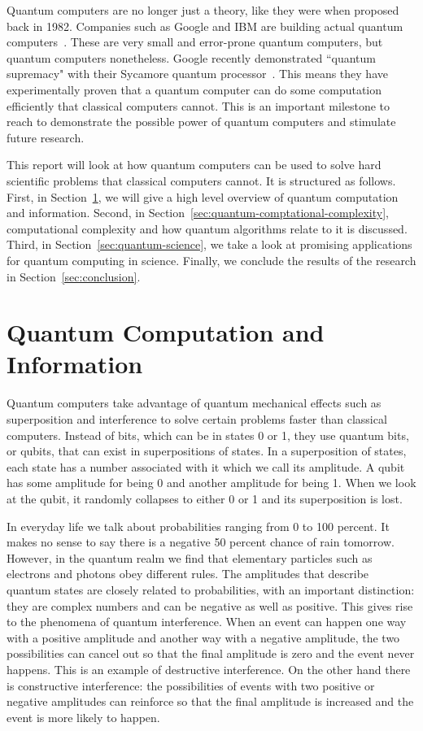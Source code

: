 \documentclass[twocolumn, switch]{article}
\begin{document}
    Quantum computers are no longer just a theory, like they were when proposed back in 1982.
    Companies such as Google and IBM are building actual quantum computers~\cite{google-quantum, ibm-quantum}.
    These are very small and error-prone quantum computers, but quantum computers nonetheless.
    Google recently demonstrated ``quantum supremacy" with their Sycamore quantum processor~\cite{arute2019quantum}.
    This means they have experimentally proven that a quantum computer can do some computation efficiently that classical computers cannot.
    This is an important milestone to reach to demonstrate the possible power of quantum computers and stimulate future research.
    
    This report will look at how quantum computers can be used to solve hard scientific problems that classical computers cannot.
    It is structured as follows.
    First, in Section~\ref{sec:quantum-computation-information}, we will give a high level overview of quantum computation and information.
    Second, in Section~\ref{sec:quantum-comptational-complexity}, computational complexity and how quantum algorithms relate to it is discussed.
    Third, in Section~\ref{sec:quantum-science}, we take a look at promising applications for quantum computing in science.
    Finally, we conclude the results of the research in Section~\ref{sec:conclusion}.
    
    \section{Quantum Computation and Information} \label{sec:quantum-computation-information}
    Quantum computers take advantage of quantum mechanical effects such as superposition and interference to solve certain problems faster than classical computers.
    Instead of bits, which can be in states 0 or 1, they use quantum bits, or qubits, that can exist in superpositions of states.
    In a superposition of states, each state has a number associated with it which we call its amplitude.
    A qubit has some amplitude for being 0 and another amplitude for being 1.
    When we look at the qubit, it randomly collapses to either 0 or 1 and its superposition is lost.
    
    In everyday life we talk about probabilities ranging from 0 to 100 percent. It makes no sense to say there is a negative 50 percent chance of rain tomorrow.
    However, in the quantum realm we find that elementary particles such as electrons and photons obey different rules.
    The amplitudes that describe quantum states are closely related to probabilities, with an important distinction: they are complex numbers and can be negative as well as positive.
    This gives rise to the phenomena of quantum interference.
    When an event can happen one way with a positive amplitude and another way with a negative amplitude, the two possibilities can cancel out so that the final amplitude is zero and the event never happens.
    This is an example of destructive interference.
    On the other hand there is constructive interference: the possibilities of events with two positive or negative amplitudes can reinforce so that the final amplitude is increased and the event is more likely to happen.
    
\end{document}
